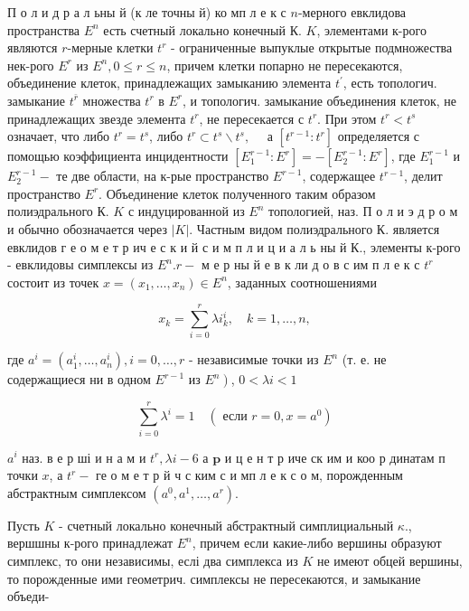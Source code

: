 \documentclass[10pt]{article}
\begin{document}
П о л и д р а л ьны й (к ле точны й) ко мп л е к с $n$-мерного евклидова пространства $E^{n}$ есть счетный локально конечный К. $K$, элементами к-рого являются $r$-мерные клетки $t^{r}$ - ограниченные выпуклые открытые подмножества нек-рого $E^{r}$ из $E^{n}, 0 \leqslant r \leqslant n$, причем клетки попарно не пересекаются, объединение клеток, принадлежащих замыканию элемента $t^{\prime}$, есть топологич. замыкание $t^{\bar{r}}$ множества $t^{r}$ в $E^{r}$, и топологич. замыкание объединения клеток, не принадлежащих звезде элемента $t^{r}$, не пересекается с $t^{r}$. При этом $t^{r}<t^{s}$ означает, что либо $t^{r}=t^{s}$, либо $t^{r} \subset t^{s} \backslash t^{s}, \quad$ а $\left[t^{r-1}: t^{r}\right]$ определяется с помощью коэффициента инцидентности $\left[E_{1}^{r-1}: E^{r}\right]=-\left[E_{2}^{r-1}: E^{r}\right]$, где $E_{1}^{r-1}$ и $E_{2}^{r-1}-$ те две области, на к-рые пространство $E^{r-1}$, содержащее $t^{r-1}$, делит пространство $E^{r}$. Объединение клеток полученного таким образом полиэдрального К. $K$ с индуцированной из $E^{n}$ топологией, наз. П о л и э д р о м и обычно обозначается через $|K|$. Частным видом полиэдрального К. является евклидов г е о м е т р ич е с к и й с и м п л и ц и а л ь ны й К., элементы к-рого - евклидовы симплексы из $E^{n} . r-$ м е р ны й е в к ли д о в с им п л е к с $t^{r}$ состоит из точек $x=\left(x_{1}, \ldots, x_{n}\right) \in E^{n}$, заданных соотношениями



\[

x_{k}=\sum_{i=0}^{r} \lambda i_{k}^{i}, \quad k=1, \ldots, n,

\]



где $a^{i}=\left(a_{1}^{i}, \ldots, a_{n}^{i}\right), i=0, \ldots, r$ - независимые точки из $E^{n}$ (т. е. не содержащиеся ни в одном $E^{r-1}$ из $\left.E^{n}\right)$, $0<\lambda i<1$



\[

\sum_{i=0}^{r} \lambda^{i}=1 \quad\left(\text { если } r=0, x=a^{0}\right)

\]



$a^{i}$ наз. в е р ші и н а м и $t^{r}, \lambda i-6$ а $\mathbf{p}$ и ц е н т р иче ск им и коо р динатам п точки $x$, а $t^{r}-$ ге о м е т р й ч с ким с и мп л е к с о м, порожденным абстрактным симплексом $\left(a^{0}, a^{1}, \ldots, a^{r}\right)$.



Пусть $K$ - счетный локально конечный абстрактный симплициальный $\kappa$., вершшны к-рого принадлежат $E^{n}$, причем если какие-либо вершины образуют симплекс, то они независимы, еслі два симплекса из $K$ не имеют обцей вершины, то порожденные ими геометрич. симплексы не пересекаются, и замыкание объеди-
\end{document}
